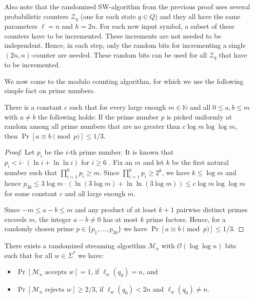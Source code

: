 \documentclass{article}\usepackage[a4paper,margin=20mm]{geometry}
\newcommand{\M}{\mathcal{M}}
\renewcommand{\O}{\mathcal{O}}
\newcommand{\BZ}{\mathcal{Z}}
\renewcommand{\geq}{\geqslant}
\renewcommand{\leq}{\leqslant}
\renewcommand{\ge}{\geq}
\renewcommand{\le}{\leq}
\begin{document}
Also note that the randomized SW-algorithm from the previous proof 
uses several probabilistic counters $\BZ_q$ (one for each state $q \in Q$) and they all have the same parameters $\ell = n$ and $h = 2n$.
For each new input symbol, a subset of these counters have to be incremented. These increments are not needed to be independent. 
Hence, in each step, only the random bits for incrementing a single $(2n,n)$-counter are needed. These random bits can be used for all $\BZ_q$ that have to be incremented. 


We now come to the modulo counting algorithm, for which we use the following simple fact on prime numbers.

\begin{lemma} \label{lemma-primes}
There is a constant $c$ such that for every large enough $m \in \mathbb{N}$ and all $0 \leq a,b \le m$ with $a \neq b$ the following holds: If the prime number $p$ is picked uniformly
at random among all prime numbers that are no greater than $c \log m \log \log m$, then $\Pr[a \equiv b \pmod p] \leq 1/3$.
\end{lemma}

\begin{proof}
Let $p_i$ be the $i$-th prime number.
It is known that 
$p_i < i \cdot  (\ln i + \ln\ln i)$ for $i \geq 6$ \cite[3.13]{RosserS62}. 
Fix an $m$ and
let $k$ be the first natural number such that $\prod_{i=1}^k p_i \ge m$. Since  
$\prod_{i=1}^k p_i \geq 2^k$, we have $k \le \log m$ and hence $p_{3k} \leq
3 \log m \cdot (\ln (3 \log m) + \ln\ln(3 \log m)) \leq c \log m \log \log m$ for some constant $c$
and all large enough $m$.

Since $-m \le a - b \le m$ and any product of at least $k+1$ pairwise distinct primes
exceeds $m$, the integer $a - b \neq 0$ has at most $k$ prime factors. Hence, for a randomly chosen prime
$p \in \{p_1, \dots, p_{3k}\}$ we have $\Pr[a \equiv b \pmod p] \leq 1/3$.  
\end{proof}


\begin{lemma}
	\label{lem:modulocounting}
	There exists a randomized streaming algorithm $\M_n$ with $\O(\log \log n)$ bits
	such that for all $w \in \Sigma^*$ we have:
	\begin{itemize}
		\item $\Pr[\M_n \text{ accepts } w] = 1$, if $\ell_w(q_0) = n$, and
		\item $\Pr[\M_n \text{ rejects } w] \ge 2/3$, if $\ell_w(q_0) < 2n$ and $\ell_w(q_0) \neq n$.
	\end{itemize}
\end{lemma}
\end{document}
